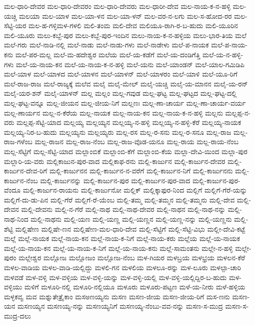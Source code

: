 ಮಲ-ಧಾರಿ-ದೇವರ
ಮಲ-ಧಾರಿ-ದೇವರಂ
ಮಲ-ಧಾರಿ-ದೇವರು
ಮಲ-ಧಾರೀ-ದೇವ
ಮಲ-ನಾಯ-ಕ-ನ-ಹಳ್ಳಿ
ಮಲ-ಯಚ್ಚಿ
ಮಲಯಾ
ಮಲ-ಯಾಳ
ಮಲ-ಯಾ-ಳನ
ಮಲ-ಯಾ-ಳನ್
ಮಲ-ವರ-ನ-ಲಗು
ಮಲ-ಸ-ಹೋದ-ರರ
ಮಲ-ಸೆಟ್ಟಿ-ಯರ
ಮಲ-ಹ-ಗಳ್ಳಿಮಳ-ಗಳಲಿ
ಮಲಿ-ತಂಮ
ಮಲಿ-ದೇವ
ಮಲಿಯೂ-ರಾಗಿ-ರ-ಬ-ಹುದು
ಮಲಿ-ಯೂರಿನ
ಮಲಿ-ಯೂರು
ಮಲು-ಕಬ್ಬೆ-ಪುರ
ಮಲು-ಕಬ್ಬೆ-ಪುರ-ಇಂದಿನ
ಮಲು-ನಾಯ-ಕ-ನ-ಹಳ್ಳಿಯ
ಮಲು-ಭಾರ-ತಿಯ
ಮಲೆ
ಮಲೆ-ಗರು
ಮಲೆ-ನಾಡಿ-ನಲ್ಲಿ
ಮಲೆ-ನಾಡು
ಮಲೆ-ನಾಡು-ಗಳು
ಮಲೆ-ನಾಡೇಳು
ಮಲೆ-ಪ-ನಾಯಕ
ಮಲೆ-ಪ-ನಾಯ-ಕನು
ಮಲೆ-ಪರ-ಮಲ್ಲ
ಮಲೆ-ಮ-ಹದೇಶ್ವರ
ಮಲೆಯ
ಮಲೆ-ಯ-ಕಡೆಗೆ
ಮಲೆ-ಯ-ದಂಡಿಗೆತ್ತಿ
ಮಲೆ-ಯ-ನ-ಹಳ್ಳಿ-ಗಳು
ಮಲೆ-ಯ-ನಾಯ-ಕನ
ಮಲೆ-ಯ-ನಾಯ-ಕ-ನ-ಹಳ್ಳಿ
ಮಲೆ-ಯನು
ಮಲೆ-ಯಾಂಡನ್
ಮಲೆ-ಯಾಲ-ಗಮಿಡಿಪಿ
ಮಲೆ-ಯಾಳ
ಮಲೆ-ಯಾಳದ
ಮಲೆ-ಯಾಳನ
ಮಲೆ-ಯಾಳನ್
ಮಲೆ-ಯಾಳರಂ
ಮಲೆ-ಯಾಳಿ
ಮಲೆ-ಯೂ-ರಿಗೆ
ಮಲೆ-ರಾಜ-ರಾಜ
ಮಲೆ-ರಾಜ್ಯಕ್ಕೆ
ಮಲೆವ
ಮಲೈ
ಮಲೈ-ಮೇಲ್
ಮಲೈ-ಯಚ್ಚಿ
ಮಲೈ-ಯ-ಮಾನನ
ಮಲೈ-ಯ-ರನ್
ಮಲೈ-ಯರ-ಶನ್
ಮಲೈ-ಯಾಳನ್
ಮಲ್ಲ
ಮಲ್ಲಂ
ಮಲ್ಲ-ಗವುಡ
ಮಲ್ಲ-ಘಟ್ಟ
ಮಲ್ಲ-ಘಟ್ಟದ
ಮಲ್ಲ-ಘಟ್ಟ-ದಲ್ಲಿ
ಮಲ್ಲ-ಘಟ್ಟ-ವನ್ನೂ
ಮಲ್ಲ-ಜೀಯನ
ಮಲ್ಲ-ಜೀಯ-ನಿಗೆ
ಮಲ್ಲಣಃ
ಮಲ್ಲ-ಣಾ-ಚಾರ್ಯ
ಮಲ್ಲ-ಣಾ-ಚಾರ್ಯ-ವರ್ಯ
ಮಲ್ಲ-ಣಾರ್ಯನ
ಮಲ್ಲ-ನ-ಕೆರೆಯ
ಮಲ್ಲ-ನಾಯಕ
ಮಲ್ಲ-ನಾಯ-ಕನ
ಮಲ್ಲ-ನಾಯ-ಕ-ನ-ಹಳ್ಳಿ
ಮಲ್ಲನು
ಮಲ್ಲಪ್ಪ-ನ-ವರು
ಮಲ್ಲಪ್ಪ-ಸೆಟ್ಟಿ-ಯಾದ
ಮಲ್ಲಯ್ಯ
ಮಲ್ಲಯ್ಯನ
ಮಲ್ಲಯ್ಯ-ನ-ಹಳ್ಳಿ
ಮಲ್ಲಯ್ಯ-ನ-ಹಳ್ಳಿ-ಕೆರೆ
ಮಲ್ಲಯ್ಯ-ನಾಯಕ
ಮಲ್ಲಯ್ಯ-ನಿರ-ಬ-ಹುದು
ಮಲ್ಲಯ್ಯನು
ಮಲ್ಲಯ್ಯರು
ಮಲ್ಲ-ರಸ
ಮಲ್ಲ-ರ-ಸನು
ಮಲ್ಲ-ರ-ಸನೂ
ಮಲ್ಲ-ರಾಜ
ಮಲ್ಲ-ರಾಜ-ಗಳೆಂಬ
ಮಲ್ಲ-ರಾಜನ
ಮಲ್ಲ-ರಾಜ-ನೆಂಬ
ಮಲ್ಲ-ರಾಜ-ವೊಡ-ಯನೂ
ಮಲ್ಲ-ರಾಯ
ಮಲ್ಲ-ರಾಯ-ನೆಂಬ
ಮಲ್ಲ-ಸೆಟ್ಟಿಗೆ
ಮಲ್ಲ-ಸೆಟ್ಟಿ-ಯಾದ
ಮಲ್ಲಾಂಬಿಕೆ
ಮಲ್ಲಾಂಬಿ-ಕೆಗೆ
ಮಲ್ಲಾಂಬಿ-ಕೆಯ
ಮಲ್ಲಾ-ದೇವಿ-ಯಿಂದ
ಮಲ್ಲಾ-ಪುರ
ಮಲ್ಲಾರಿ-ಯ-ವರು
ಮಲ್ಲಿಕಾಜುನ-ಪುರ-ವಾದ
ಮಲ್ಲಿಕಾಫ-ರನು
ಮಲ್ಲಿ-ಕಾರ್ಜುನ
ಮಲ್ಲಿ-ಕಾರ್ಜುನ-ದೇವರ
ಮಲ್ಲಿ-ಕಾರ್ಜುನ-ದೇವ-ರಿಗೆ
ಮಲ್ಲಿ-ಕಾರ್ಜುನನ
ಮಲ್ಲಿ-ಕಾರ್ಜುನ-ನ-ವರೆಗೆ
ಮಲ್ಲಿ-ಕಾರ್ಜುನ-ನಿಗೆ
ಮಲ್ಲಿ-ಕಾರ್ಜುನನು
ಮಲ್ಲಿ-ಕಾರ್ಜುನ-ನೆಂಬ
ಮಲ್ಲಿ-ಕಾರ್ಜುನನ್ನು
ಮಲ್ಲಿ-ಕಾರ್ಜುನ-ಪುರ
ಮಲ್ಲಿ-ಕಾರ್ಜುನ-ಪುರ-ವಾದ
ಮಲ್ಲಿ-ಕಾರ್ಜುನ-ಪುರ-ವೆಂದೂ
ಮಲ್ಲಿ-ಕಾರ್ಜುನ-ರಾಯನು
ಮಲ್ಲಿ-ಕಾರ್ಜುನೋ
ಮಲ್ಲಿಕ್
ಮಲ್ಲಿಕ್ಕಾಫುರ-ನಿಂದ
ಮಲ್ಲಿಗೆ
ಮಲ್ಲಿಗೆ-ಗೆರೆ-ಯನ್ನು
ಮಲ್ಲಿಗೆ-ದು-ಡು-ಪಿನ
ಮಲ್ಲಿ-ಗೆರೆ
ಮಲ್ಲಿಗೆ-ರೆ-ಯೆಂಬ
ಮಲ್ಲಿ-ತಮ್ಮ
ಮಲ್ಲಿ-ತಮ್ಮನ
ಮಲ್ಲಿ-ತಮ್ಮನು
ಮಲ್ಲಿ-ದೇವ
ಮಲ್ಲಿ-ದೇವನ
ಮಲ್ಲಿ-ದೇವನು
ಮಲ್ಲಿ-ನ-ಗೆರೆ
ಮಲ್ಲಿ-ನಾಥ
ಮಲ್ಲಿ-ನಾಥ-ದೇವರ
ಮಲ್ಲಿ-ನಾಥನ
ಮಲ್ಲಿ-ನಾಥ-ನನ್ನು
ಮಲ್ಲಿ-ನಾಥ-ನಿಂದ
ಮಲ್ಲಿ-ನಾಥನು
ಮಲ್ಲಿ-ಯಣ
ಮಲ್ಲಿ-ಯಣ್ಣ
ಮಲ್ಲಿ-ಯಣ್ಣನ
ಮಲ್ಲಿ-ಯಣ್ಣ-ನನ್ನು
ಮಲ್ಲಿ-ಯಣ್ಣನು
ಮಲ್ಲಿ-ಶೆಟ್ಟಿ
ಮಲ್ಲಿಷೇಣ
ಮಲ್ಲಿಷೇ-ಣನ
ಮಲ್ಲಿಷೇಣ-ಮಲ-ಧಾರಿ-ದೇವ
ಮಲ್ಲಿ-ಸೆಟ್ಟಿಗೆ
ಮಲ್ಲಿ-ಸೆಟ್ಟಿ-ವಿಭು
ಮಲ್ಲೀ-ದೇವಿ-ಕಟ್ಟೆ
ಮಲ್ಲೆ
ಮಲ್ಲೆ-ನಾಯಕ
ಮಲ್ಲೆ-ನಾಯ-ಕನ
ಮಲ್ಲೆ-ನಾಯ-ಕ-ನಿಗೆ
ಮಲ್ಲೆ-ನಾಯ-ಕರು
ಮಲ್ಲೆಯ
ಮಲ್ಲೆ-ಯ-ನಾಯಕ
ಮಲ್ಲೆ-ಯ-ನಾಯ-ಕನ
ಮಲ್ಲೆ-ಯ-ನಾಯ-ಕ-ನಿಗೆ
ಮಲ್ಲೆ-ಯ-ನಾಯ-ಕನು
ಮಲ್ಲೆ-ಸಾಮಂತನು
ಮಲ್ಲೇ-ನ-ಹಳ್ಳಿ
ಮಲ್ಲೇ-ಪುರಂ
ಮಲ್ಲೇಶ್ವರ
ಮಲ್ಲೋಜ
ಮಲ್ಲೋಜಂ
ಮಲ್ಲೋಜ-ನೆಂಬ
ಮಳ-ಗಿಯರ
ಮಳಬ್ರಯ
ಮಳಭ್ರಯ
ಮಳಲನ-ಕೆರೆ
ಮಳಲ-ವಾಡಿಯ
ಮಳಲ-ವಾಡಿ-ಯಲ್ಲಿದ್ದು
ಮಳಲಿ-ಗನ
ಮಳಲಿಯ
ಮಳಲೂ-ರನ್ನು
ಮಳ-ಲೂರು
ಮಳಲ್ಪಾ-ಚಾರಿ
ಮಳವಡೆ
ಮಳ-ವಳ್ಳಿ
ಮಳ-ವಳ್ಳಿಯ
ಮಳ-ವಳ್ಳಿ-ಯನ್ನು
ಮಳ-ವಳ್ಳಿ-ಯಲ್ಲಿ
ಮಳ-ವಳ್ಳಿ-ಯಲ್ಲಿದ್ದಿರ-ಬ-ಹುದು
ಮಳ-ವಳ್ಳಿಯು
ಮಳಿಗೆ
ಮಳೂರಿ-ನಲ್ಲಿ
ಮಳೂರಿ-ನಲ್ಲಿಯೂ
ಮಳೂರು
ಮಳೂರು-ಪಟ್ಟಣ
ಮಳೆ-ಯ-ನೀರು
ಮಳೆ-ಹಳ್ಳಿಯ
ಮಳ್ಳಕವ್ವ
ಮವ
ಮಶ್ನುತೇತ್ರೈಕಾಂ
ಮಸಅಣಯ್ಯನು
ಮಸಣ
ಮಸಣ-ಜೀಯ
ಮಸಣ-ಜೀಯ-ರಿಗೆ
ಮಸ-ಣನು
ಮಸಣ-ಯನ
ಮಸಣಯ್ಯನ
ಮಸಣಯ್ಯ-ನನ್ನು
ಮಸಣಯ್ಯನಿಗೆ
ಮಸಣಯ್ಯ-ನೆಂಬು-ವವ-ನನ್ನು
ಮಸಣ-ಸ-ಮುದ್ರ
ಮಸಣ-ಸ-ಮುದ್ರ-ದಲು
